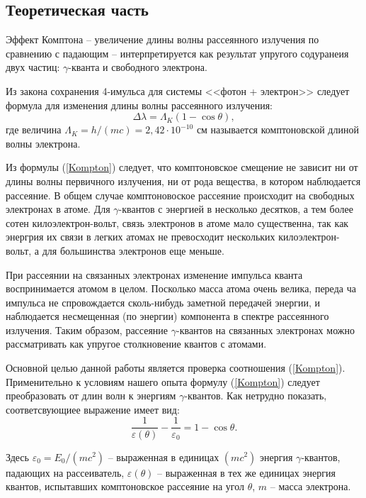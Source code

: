 \documentclass[a4paper,12pt]{article} %
\begin{document}
\subsection{Теоретическая часть}
	Эффект Комптона -- увеличение длины волны рассеянного излучения по сравнению с падающим -- интерпретируется как результат упругого содуранеия двух частиц: $\gamma$-кванта и свободного электрона.
	
	Из закона сохранения 4-имульса для системы <<фотон + электрон>> следует формула для изменения длины волны рассеянного излучения:
	\begin{equation}
		\label{Kompton}
		\tag{$\star$}
		\Delta \lambda = \Lambda_K(1-\cos\theta),
	\end{equation}
	где величина $\Lambda_K = h/(mc) = 2,42 \cdot 10^{-10}$ см называется комптоновской длиной волны электрона.
	
	Из формулы (\ref{Kompton}) следует, что комптоновское смещение не зависит ни от длины волны первичного излучения, ни от рода вещества, в котором наблюдается рассеяние. В общем случае комптоновоское рассеяние происходит на свободных электронах в атоме. Для $\gamma$-квантов с энергией в несколько десятков, а тем более сотен килоэлектрон-вольт, связь электронов в атоме мало существенна, так как энергрия их связи в легких атомах не превосходит нескольких килоэлектрон-вольт, а для большинства электронов еще меньше.
	
	При рассеянии на связанных электронах изменение импульса кванта воспринимается атомом в целом. Посколько масса атома очень велика, переда ча импульса не спровождается сколь-нибудь заметной передачей энергии, и наблюдается несмещенная (по энергии) компонента в спектре рассеянного излучения. Таким образом, рассеяние $\gamma$-квантов на связанных электронах можно рассматривать как упругое столкновение квантов с атомами.
	
	Основной целью данной работы является проверка соотношения (\ref{Kompton}). Применительно к условиям нашего опыта формулу (\ref{Kompton}) следует преобразовать от длин волн к энергиям $\gamma$-квантов. Как нетрудно показать, соответсвующиее выражение имеет вид:
	\begin{equation}
		\label{1-cos}
		\tag{$\star\star$}
		\frac{1}{\varepsilon(\theta)} - \frac{1}{\varepsilon_0} = 1 - \cos \theta.
	\end{equation}

	Здесь $\varepsilon_0 = E_0/(mc^2)$ -- выраженная в единицах $(mc^2)$ энергия $\gamma$-квантов, падающих на рассеиватель, $\varepsilon(\theta)$ -- выраженная в тех же единицах энергия квантов, испытавших комптоновское рассеяние на угол $\theta$, $m$ -- масса электрона.
	
\end{document}
